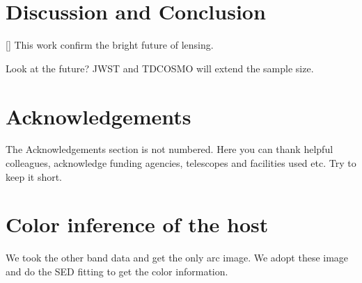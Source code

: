 \documentclass[fleqn,usenatbib]{mnras}
\begin{document}
\section{Discussion and Conclusion}
[] This work confirm the bright future of lensing.

Look at the future? JWST and TDCOSMO will extend the sample size.


\section*{Acknowledgements}

The Acknowledgements section is not numbered. Here you can thank helpful
colleagues, acknowledge funding agencies, telescopes and facilities used etc.
Try to keep it short.










\appendix

\section{Color inference of the host}
We took the other band data and get the only arc image. We adopt these image and do the SED fitting to get the color information.



\bsp	%
\label{lastpage}
\end{document}
